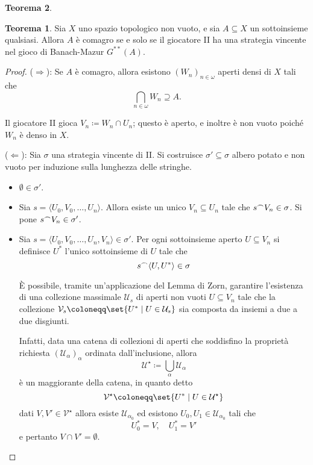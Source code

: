 \documentclass[titlepage]{article}
\newcommand{\1}{\mathds{1}}
\newcommand{\concat}{\null^{\frown}} %
\theoremstyle{definition}%
\newtheorem{thm}{Teorema}[section]
\theoremstyle{plain}
\theoremstyle{remark}
\begin{document}
\begin{thm}
\begin{thm}\label{sec:org5e232d7}
Sia \(X\) uno {spazio topologico} {non vuoto}, e sia \(A \subseteq X\) un {sottoinsieme} qualsiasi. Allora \(A\) è {comagro} se e solo se il giocatore II ha una {strategia vincente} nel {gioco di Banach-Mazur} \(G^{**}(A)\).
\end{thm}

\begin{proof}
(\(\Rightarrow\)): Se \(A\) è comagro, allora esistono \((W_{n})_{n \in\omega}\) aperti densi di \(X\) tali che
\begin{equation*}
\bigcap_{n \in\omega} W_{n} \supseteq A.
\end{equation*}

Il giocatore II gioca \(V_{n} \coloneqq W_{n}\cap U_{n}\); questo è aperto, e inoltre è non vuoto poiché \(W_{n}\) è denso in \(X\).

(\(\Leftarrow\)): Sia \(\sigma\) una strategia vincente di II. Si costruisce \(\sigma' \subseteq \sigma\) albero potato e non vuoto per induzione sulla lunghezza delle stringhe.
\begin{itemize}
\item \(\emptyset \in \sigma'\).
\item Sia \(s=\langle U_{0},V_{0},\dots,U_{n}\rangle\). Allora esiste un unico \(V_{n} \subseteq U_{n}\) tale che \(s\concat V_{n} \in \sigma\). Si pone \(s\concat V_{n} \in \sigma'\).
\item Sia \(s = \langle U_{0},V_{0},\dots, U_{n}, V_{n}\rangle \in \sigma'\). Per ogni sottoinsieme aperto \(U \subseteq V_{n}\) si definisce \(U^{*}\) l'unico sottoinsieme di \(U\) tale che
\begin{equation*}
  s\concat \langle U,U^{*}\rangle \in \sigma
\end{equation*}

È possibile, tramite un'applicazione del Lemma di Zorn, garantire l'esistenza di una collezione massimale \(\mathcal{U}_{s}\) di aperti non vuoti \(U \subseteq V_{n}\) tale che la collezione \(\mathcal{V}_{s} \coloneqq \set{U^{*}\mid U \in \mathcal{U}_{s}}\) sia composta da insiemi a due a due disgiunti.

Infatti, data una catena di collezioni di aperti che soddisfino la proprietà richiesta \((\mathcal{U}_{\alpha})_{\alpha}\) ordinata dall'inclusione, allora
\begin{equation*}
\mathcal{U}^{\star}\coloneqq \bigcup_{\alpha} \mathcal{U}_{\alpha}
\end{equation*}
è un maggiorante della catena, in quanto detto
\begin{equation*}
\mathcal{V}^{\star} \coloneqq \set{U^{*}\mid U \in \mathcal{U}^{\star}}
\end{equation*}
dati \(V,V' \in \mathcal{V}^{\star}\) allora esiste \(\mathcal{U}_{\alpha_{0}}\) ed esistono \(U_{0},U_{1} \in \mathcal{U}_{\alpha_{0}}\) tali che
\begin{equation*}
U_{0}^{*}=V,\quad U_{1}^{*} = V'
\end{equation*}
e pertanto \(V\cap V' =\emptyset\).


\end{itemize}
\end{proof}
\end{thm}
\end{document}
